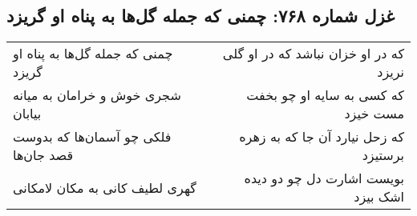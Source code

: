 \begin{center}
\section*{غزل شماره ۷۶۸: چمنی که جمله گل‌ها به پناه او گریزد}
\label{sec:0768}
\begin{longtable}{l p{0.5cm} r}
چمنی که جمله گل‌ها به پناه او گریزد
&&
که در او خزان نباشد که در او گلی نریزد
\\
شجری خوش و خرامان به میانه بیابان
&&
که کسی به سایه او چو بخفت مست خیزد
\\
فلکی چو آسمان‌ها که بدوست قصد جان‌ها
&&
که زحل نیارد آن جا که به زهره برستیزد
\\
گهری لطیف کانی به مکان لامکانی
&&
بویست اشارت دل چو دو دیده اشک بیزد
\\
\end{longtable}
\end{center}
